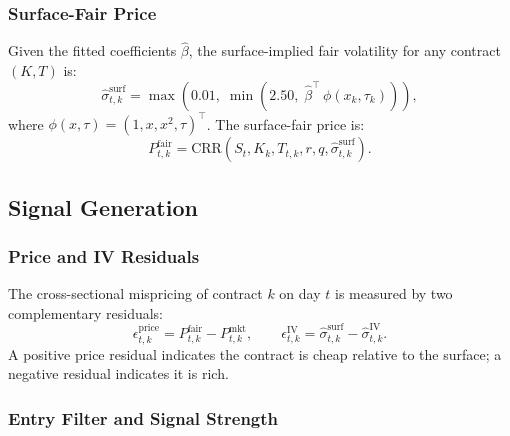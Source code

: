 \documentclass[10pt,twocolumn]{article}
\begin{document}
\subsubsection{Surface-Fair Price}

Given the fitted coefficients $\hat{\beta}$, the surface-implied fair
volatility for any contract $(K, T)$ is:
%
\begin{equation}
\hat{\sigma}^{\text{surf}}_{t,k} = \max\!\left(0.01,\;
  \min\!\left(2.50,\;
  \hat{\beta}^{\top}\,\phi(x_k,\tau_k)
  \right)\right),
\end{equation}
%
where $\phi(x,\tau) = (1, x, x^2, \tau)^{\top}$. The surface-fair price is:
%
\begin{equation}
P_{t,k}^{\text{fair}} = \text{CRR}\!\left(
  S_t, K_k, T_{t,k}, r, q, \hat{\sigma}_{t,k}^{\text{surf}}
\right).
\end{equation}

\subsection{Signal Generation}

\subsubsection{Price and IV Residuals}

The cross-sectional mispricing of contract $k$ on day $t$ is measured by two
complementary residuals:
%
\begin{equation}
\epsilon_{t,k}^{\text{price}} = P_{t,k}^{\text{fair}} - P_{t,k}^{\text{mkt}},
\qquad
\epsilon_{t,k}^{\text{IV}} = \hat{\sigma}_{t,k}^{\text{surf}}
                            - \hat{\sigma}_{t,k}^{\text{IV}}.
\end{equation}
%
A positive price residual indicates the contract is cheap relative to the
surface; a negative residual indicates it is rich.

\subsubsection{Entry Filter and Signal Strength}
\end{document}
